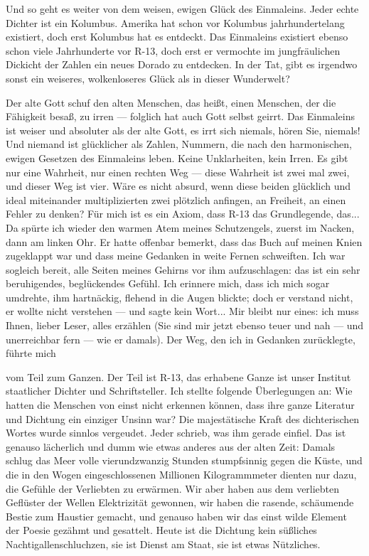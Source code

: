 Und so geht es weiter von dem weisen, ewigen Glück des Einmaleins.
Jeder echte Dichter ist ein Kolumbus. Amerika hat schon vor
Kolumbus jahrhundertelang existiert, doch erst Kolumbus hat es
entdeckt. Das Einmaleins existiert ebenso schon viele Jahrhunderte
vor R-13, doch erst er vermochte im jungfräulichen Dickicht der
Zahlen ein neues Dorado zu entdecken. In der Tat, gibt es irgendwo
sonst ein weiseres, wolkenloseres Glück als in dieser Wunderwelt?

Der alte Gott schuf den alten Menschen, das heißt, einen Menschen,
der die Fähigkeit besaß, zu irren — folglich hat auch Gott selbst
geirrt. Das Einmaleins ist weiser und absoluter als der alte Gott,
es irrt sich niemals, hören Sie, niemals! Und niemand ist
glücklicher als Zahlen, Nummern, die nach den harmonischen, ewigen
Gesetzen des Einmaleins leben. Keine Unklarheiten, kein Irren. Es
gibt nur eine Wahrheit, nur einen rechten Weg — diese Wahrheit ist
zwei mal zwei, und dieser Weg ist vier. Wäre es nicht absurd, wenn
diese beiden glücklich und ideal miteinander multiplizierten zwei
plötzlich anfingen, an Freiheit, an einen Fehler zu denken? Für
mich ist es ein Axiom, dass R-13 das Grundlegende, das... Da spürte
ich wieder den warmen Atem meines Schutzengels, zuerst im Nacken,
dann am linken Ohr. Er hatte offenbar bemerkt, dass das Buch auf
meinen Knien zugeklappt war und dass meine Gedanken in weite Fernen
schweiften. Ich war sogleich bereit, alle Seiten meines Gehirns vor
ihm aufzuschlagen: das ist ein sehr beruhigendes, beglückendes
Gefühl. Ich erinnere mich, dass ich mich sogar umdrehte, ihm
hartnäckig, flehend in die Augen blickte; doch er verstand nicht,
er wollte nicht verstehen — und sagte kein Wort... Mir bleibt nur
eines: ich muss Ihnen, lieber Leser, alles erzählen (Sie sind mir
jetzt ebenso teuer und nah — und unerreichbar fern — wie er
damals). Der Weg, den ich in Gedanken zurücklegte, führte mich

vom Teil zum Ganzen. Der Teil ist R-13, das erhabene Ganze ist
unser Institut staatlicher Dichter und Schriftsteller. Ich stellte
folgende Überlegungen an: Wie hatten die Menschen von einst nicht
erkennen können, dass ihre ganze Literatur und Dichtung ein
einziger Unsinn war? Die majestätische Kraft des dichterischen
Wortes wurde sinnlos vergeudet. Jeder schrieb, was ihm gerade
einfiel. Das ist genauso lächerlich und dumm wie etwas anderes aus
der alten Zeit: Damals schlug das Meer volle vierundzwanzig Stunden
stumpfsinnig gegen die Küste, und die in den Wogen eingeschlossenen
Millionen Kilogrammmeter dienten nur dazu, die Gefühle der
Verliebten zu erwärmen. Wir aber haben aus dem verliebten Geflüster
der Wellen Elektrizität gewonnen, wir haben die rasende, schäumende
Bestie zum Haustier gemacht, und genauso haben wir das einst wilde
Element der Poesie gezähmt und gesattelt. Heute ist die Dichtung
kein süßliches Nachtigallenschluchzen, sie ist Dienst am Staat, sie
ist etwas Nützliches.

